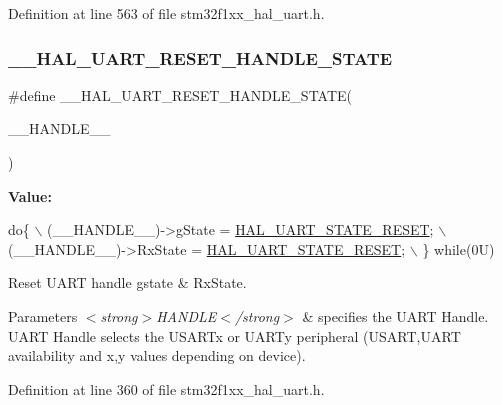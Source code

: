 Definition at line 563 of file stm32f1xx\+\_\+hal\+\_\+uart.\+h.

\mbox{\label{group___u_a_r_t___exported___macros_ga19deab848407b106998416c78092fa9b}} 
\subsubsection{\texorpdfstring{\+\_\+\+\_\+\+H\+A\+L\+\_\+\+U\+A\+R\+T\+\_\+\+R\+E\+S\+E\+T\+\_\+\+H\+A\+N\+D\+L\+E\+\_\+\+S\+T\+A\+TE}{\_\_HAL\_UART\_RESET\_HANDLE\_STATE}}
{\footnotesize\ttfamily \#define \+\_\+\+\_\+\+H\+A\+L\+\_\+\+U\+A\+R\+T\+\_\+\+R\+E\+S\+E\+T\+\_\+\+H\+A\+N\+D\+L\+E\+\_\+\+S\+T\+A\+TE(\begin{DoxyParamCaption}\item[{}]{\+\_\+\+\_\+\+H\+A\+N\+D\+L\+E\+\_\+\+\_\+ }\end{DoxyParamCaption})}

{\bfseries Value\+:}
\begin{DoxyCode}
\textcolor{keywordflow}{do}\{                                                   \(\backslash\)
                                                       (\_\_HANDLE\_\_)->gState = 
      \hyperlink{group___u_a_r_t___exported___types_ggaf55d844a35379c204c90be5d1e8e50baa9c7d889fce61ccc717228d099a61d113}{HAL\_UART\_STATE\_RESET};      \(\backslash\)
                                                       (\_\_HANDLE\_\_)->RxState = 
      \hyperlink{group___u_a_r_t___exported___types_ggaf55d844a35379c204c90be5d1e8e50baa9c7d889fce61ccc717228d099a61d113}{HAL\_UART\_STATE\_RESET};     \(\backslash\)
                                                     \} \textcolor{keywordflow}{while}(0U)
\end{DoxyCode}


Reset U\+A\+RT handle gstate \& Rx\+State. 


\begin{DoxyParams}{Parameters}
{\em $<$strong$>$\+H\+A\+N\+D\+L\+E$<$/strong$>$} & specifies the U\+A\+RT Handle. U\+A\+RT Handle selects the U\+S\+A\+R\+Tx or U\+A\+R\+Ty peripheral (U\+S\+A\+RT,U\+A\+RT availability and x,y values depending on device). \\
\hline
\end{DoxyParams}


Definition at line 360 of file stm32f1xx\+\_\+hal\+\_\+uart.\+h.

